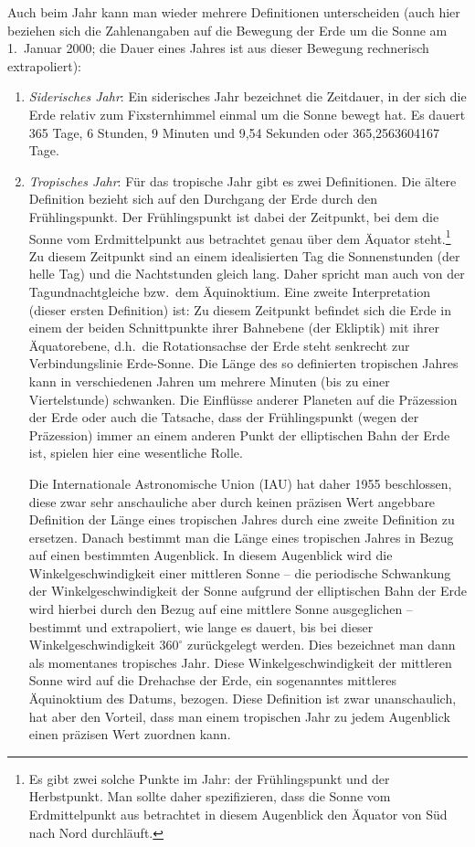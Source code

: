 Auch beim Jahr kann man wieder mehrere Definitionen unterscheiden (auch hier beziehen sich
die Zahlenangaben auf die Bewegung der Erde um die Sonne am 1.\ Januar 2000; die Dauer
eines Jahres ist aus dieser Bewegung rechnerisch extrapoliert):
\begin{enumerate}
\item
\textit{Siderisches Jahr}:
Ein siderisches Jahr bezeichnet die Zeitdauer, in der sich die Erde relativ zum Fixsternhimmel
einmal um die Sonne bewegt hat. Es dauert 365 Tage, 6 Stunden, 9 Minuten und 9,54
Sekunden oder 365,2563604167 Tage. 
\item
\textit{Tropisches Jahr}:
F\"ur das tropische Jahr gibt es zwei Definitionen. Die \"altere Definition bezieht sich auf den
Durchgang der Erde durch den Fr\"uhlingspunkt. Der Fr\"uhlingspunkt ist
dabei der Zeitpunkt, bei dem die Sonne vom Erdmittelpunkt aus betrachtet genau \"uber
dem \"Aquator steht.\footnote{Es gibt zwei solche Punkte im Jahr: der Fr\"uhlingspunkt und
der Herbstpunkt. Man sollte daher spezifizieren, dass die Sonne vom Erdmittelpunkt aus
betrachtet in diesem Augenblick den \"Aquator von S\"ud nach Nord durchl\"auft.} 
Zu diesem Zeitpunkt sind an einem idealisierten Tag die Sonnenstunden
(der helle Tag) und die Nachtstunden gleich lang. Daher spricht man auch von der
Tagundnachtgleiche bzw.\ dem \"Aquinoktium. Eine zweite Interpretation 
(dieser ersten Definition) ist: Zu diesem Zeitpunkt befindet sich die
Erde in einem der beiden Schnittpunkte ihrer Bahnebene (der Ekliptik) mit ihrer \"Aquatorebene,
d.h.\ die Rotationsachse der Erde steht senkrecht zur Verbindungslinie Erde-Sonne.  
Die L\"ange des so definierten tropischen Jahres kann in verschiedenen Jahren um mehrere Minuten
(bis zu einer Viertelstunde) schwanken. Die Einfl\"usse anderer Planeten auf die Pr\"azession der
Erde oder auch die Tatsache, dass der Fr\"uhlingspunkt (wegen der Pr\"azession) immer an einem
anderen Punkt der elliptischen Bahn der Erde ist, spielen hier eine wesentliche Rolle.

Die Internationale Astronomische Union (IAU) hat daher 1955 beschlossen, diese zwar sehr
anschauliche aber durch keinen pr\"azisen Wert angebbare Definition der L\"ange eines tropischen
Jahres durch eine zweite Definition zu ersetzen. Danach bestimmt man die L\"ange eines tropischen
Jahres in Bezug auf einen bestimmten Augenblick. In diesem Augenblick wird die Winkelgeschwindigkeit
einer mittleren Sonne -- die periodische Schwankung der Winkelgeschwindigkeit der Sonne aufgrund
der elliptischen Bahn der Erde wird hierbei durch den Bezug auf eine mittlere Sonne ausgeglichen -- bestimmt
und extrapoliert, wie lange es dauert, bis bei dieser Winkelgeschwindigkeit $360^\circ$ zur\"uckgelegt
werden. Dies bezeichnet man dann als momentanes tropisches Jahr. Diese Winkelgeschwindigkeit 
der mittleren Sonne wird auf die Drehachse der Erde, ein sogenanntes \glqq mittleres \"Aquinoktium
des Datums\grqq, bezogen. Diese Definition ist zwar unanschaulich, hat aber den Vorteil, dass man
einem tropischen Jahr zu jedem Augenblick einen pr\"azisen Wert zuordnen kann.   


\end{enumerate}
